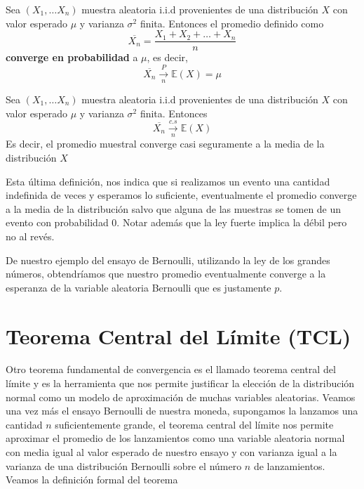 \begin{theorem} Sea $(X_1,\dots X_n)$ muestra aleatoria i.i.d provenientes de una distribución $X$ con valor esperado $\mu$ y varianza $\sigma^2$ finita.
Entonces el promedio definido como 
\[ \overline{X_n}= \frac{X_1+X_2+\dots+X_n}{n}\]
\textbf{converge en probabilidad } a $\mu$, es decir,
\[ \overline{X_n} \xrightarrow[n]{P} \mathbb{E}(X) =  \mu \] 

\end{theorem}

\begin{theorem}
Sea $(X_1,\dots X_n)$ muestra aleatoria i.i.d provenientes de una distribución $X$ con valor esperado $\mu$ y varianza $\sigma^2$ finita.
Entonces 
\[ \overline{X_n} \xrightarrow[n]{c.s} \mathbb{E}(X) \]
Es decir, el promedio muestral converge casi seguramente a la media de la distribución $X$



\end{theorem}

\begin{remark}
Esta última definición, nos indica que si realizamos un evento una cantidad indefinida de veces y esperamos lo suficiente, eventualmente el promedio converge a la media de la distribución salvo que alguna de las muestras se tomen de un evento con probabilidad 0. 
Notar además que la ley fuerte implica la débil pero no al revés. 


\end{remark}

\begin{example}

De nuestro ejemplo del ensayo de Bernoulli, utilizando la ley de los grandes números, obtendríamos que nuestro promedio eventualmente converge a la esperanza de la variable aleatoria Bernoulli que es justamente $p$. 


\end{example}

\section{Teorema Central del Límite (TCL)}

Otro teorema fundamental de convergencia es el llamado teorema central del límite y es la herramienta que nos permite justificar la elección de la distribución normal como un modelo de aproximación de muchas variables aleatorias. Veamos una vez más el ensayo Bernoulli de nuestra moneda, supongamos la lanzamos una cantidad $n$ suficientemente grande, el teorema central del límite nos permite aproximar el promedio de los lanzamientos como una variable aleatoria normal con media igual al valor esperado de nuestro ensayo y con varianza igual a la varianza de una distribución Bernoulli sobre el número $n$ de lanzamientos.
Veamos la definición formal del teorema

